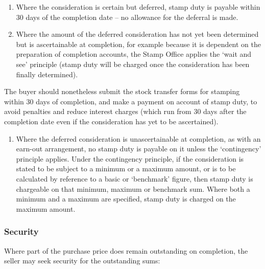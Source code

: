 \documentclass[
]{article}
\newenvironment{Shaded}{}{}
\newcommand{\NormalTok}[1]{#1}
\providecommand{\tightlist}{%
  \setlength{\itemsep}{0pt}\setlength{\parskip}{0pt}}
\begin{document}
\begin{enumerate}
\def\labelenumi{\arabic{enumi}.}
\tightlist
\item
  Where the consideration is certain but deferred, stamp duty is payable
  within 30 days of the completion date -- no allowance for the deferral
  is made.
\item
  Where the amount of the deferred consideration has not yet been
  determined but is ascertainable at completion, for example because it
  is dependent on the preparation of completion accounts, the Stamp
  Office applies the `wait and see' principle (stamp duty will be
  charged once the consideration has been finally determined).
\end{enumerate}

\begin{Shaded}
\begin{Highlighting}[]
\NormalTok{The buyer should nonetheless submit the stock transfer forms for stamping within 30 days of completion, and make a payment on account of stamp duty, to avoid penalties and reduce interest charges (which run from 30 days after the completion date even if the consideration has yet to be ascertained).}
\end{Highlighting}
\end{Shaded}

\begin{enumerate}
\def\labelenumi{\arabic{enumi}.}
\tightlist
\item
  Where the deferred consideration is unascertainable at completion, as
  with an earn-out arrangement, no stamp duty is payable on it unless
  the `contingency' principle applies. Under the contingency principle,
  if the consideration is stated to be subject to a minimum or a maximum
  amount, or is to be calculated by reference to a basic or `benchmark'
  figure, then stamp duty is chargeable on that minimum, maximum or
  benchmark sum. Where both a minimum and a maximum are specified, stamp
  duty is charged on the maximum amount.
\end{enumerate}

\hypertarget{security}{%
\subsubsection{Security}\label{security}}

Where part of the purchase price does remain outstanding on completion,
the seller may seek security for the outstanding sums:
\end{document}
